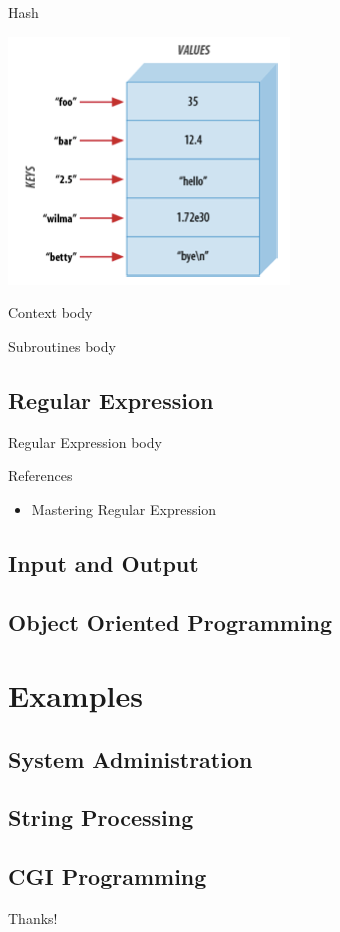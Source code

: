 \documentclass[UTF8]{beamer}
\begin{document}
\begin{frame}[t]{Hash}
  \centerline{\includegraphics[height=.8\textheight]{hash.png}}
\end{frame}



\begin{frame}[t]{Context}
  body
\end{frame}

\begin{frame}[t]{Subroutines}
  body
\end{frame}




\subsection{Regular Expression}

\begin{frame}[t]{Regular Expression}
  body
\end{frame}

\begin{frame}[t]{References}
  \begin{itemize}
    \item Mastering Regular Expression
  \end{itemize}
\end{frame}

\subsection{Input and Output}

\subsection{Object Oriented Programming}

\section{Examples}

\subsection{System Administration}

\subsection{String Processing}

\subsection{CGI Programming}

\begin{frame}
  \centerline{\Huge{Thanks!}}
\end{frame}
\end{document}

